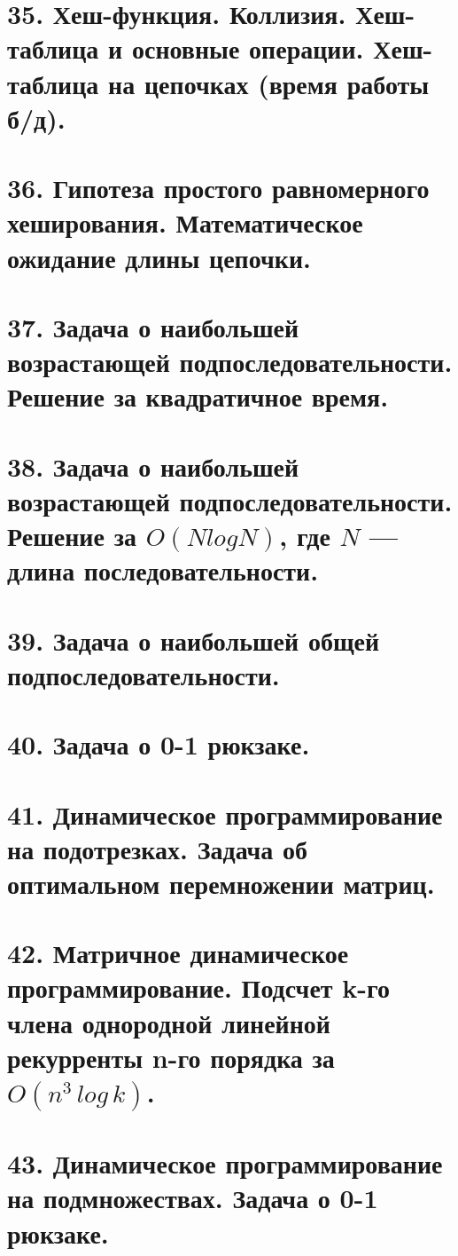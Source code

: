 \section{35. Хеш-функция. Коллизия. Хеш-таблица и основные операции. Хеш-таблица на цепочках (время
работы б/д).}


\section{36. Гипотеза простого равномерного хеширования. Математическое ожидание длины цепочки.}


\section{37. Задача о наибольшей возрастающей подпоследовательности. Решение за квадратичное время.}


\section{38. Задача о наибольшей возрастающей подпоследовательности. Решение за $O(N log N)$, где $N$ —
длина последовательности.}


\section{39. Задача о наибольшей общей подпоследовательности.}


\section{40. Задача о 0-1 рюкзаке.}


\section{41. Динамическое программирование на подотрезках. Задача об оптимальном перемножении матриц.}


\section{42. Матричное динамическое программирование. Подсчет k-го члена однородной линейной рекурренты n-го порядка за $O(n^3\,log\,k)$.}


\section{43. Динамическое программирование на подмножествах. Задача о 0-1 рюкзаке.}


